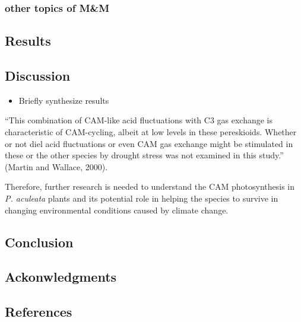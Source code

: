\documentclass[
  12pt,
  letterpaper,
  DIV=11,
  numbers=noendperiod]{scrartcl}
\providecommand{\tightlist}{%
  \setlength{\itemsep}{0pt}\setlength{\parskip}{0pt}}\usepackage{longtable,booktabs,array}
\begin{document}
\hypertarget{other-topics-of-mm}{%
\subsubsection{other topics of M\&M}\label{other-topics-of-mm}}

\hypertarget{results}{%
\subsection{Results}\label{results}}

\hypertarget{discussion}{%
\subsection{Discussion}\label{discussion}}

\begin{itemize}
\tightlist
\item
  Briefly synthesize results
\end{itemize}

``This combination of CAM-like acid fluctuations with C3 gas exchange is
characteristic of CAM-cycling, albeit at low levels in these
pereskioids. Whether or not diel acid fluctuations or even CAM gas
exchange might be stimulated in these or the other species by drought
stress was not examined in this study.'' (Martin and Wallace, 2000).

Therefore, further research is needed to understand the CAM
photosynthesis in \emph{P. aculeata} plants and its potential role in
helping the species to survive in changing environmental conditions
caused by climate change.

\hypertarget{conclusion}{%
\subsection{Conclusion}\label{conclusion}}

\hypertarget{ackonwledgments}{%
\subsection{Ackonwledgments}\label{ackonwledgments}}

\clearpage

\hypertarget{references}{%
\subsection{References}\label{references}}
\end{document}
